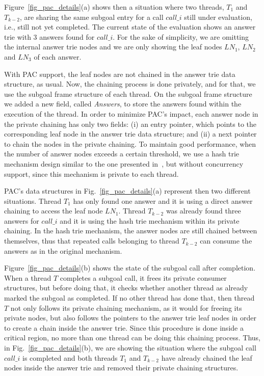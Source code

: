 \documentclass{llncs}
\begin{document}
Figure~\ref{fig_pac_details}(a) shows then a situation where two
threads, $T_1$ and $T_{k-2}$, are sharing the same subgoal entry for a
call $call\_i$ still under evaluation, i.e., still not yet
completed. The current state of the evaluation shows an answer trie
with 3 answers found for $call\_i$. For the sake of simplicity, we are
omitting the internal answer trie nodes and we are only showing the
leaf nodes $LN_1$, $LN_2$ and $LN_3$ of each answer.

With PAC support, the leaf nodes are not chained in the answer trie
data structure, as usual. Now, the chaining process is done privately,
and for that, we use the subgoal frame structure of each thread. On
the subgoal frame structure we added a new field, called
\emph{Answers}, to store the answers found within the execution of the
thread. In order to minimize PAC's impact, each answer node in the
private chaining has only two fields: (i) an entry pointer, which
points to the corresponding leaf node in the answer trie data
structure; and (ii) a next pointer to chain the nodes in the private
chaining. To maintain good performance, when the number of answer
nodes exceeds a certain threshold, we use a hash trie mechanism design
similar to the one presented in~\cite{Areias-ijpp15}, but without
concurrency support, since this mechanism is private to each thread.

PAC's data structures in Fig.~\ref{fig_pac_details}(a) represent then
two different situations. Thread $T_1$ has only found one answer and
it is using a direct answer chaining to access the leaf node
$LN_1$. Thread $T_{k-2}$ was already found three answers for $call\_i$
and it is using the hash trie mechanism within its private
chaining. In the hash trie mechanism, the answer nodes are still
chained between themselves, thus that repeated calls belonging to
thread $T_{k-2}$ can consume the answers as in the original mechanism.

Figure~\ref{fig_pac_details}(b) shows the state of the subgoal call
after completion. When a thread $T$ completes a subgoal call, it frees
its private consumer structures, but before doing that, it checks
whether another thread as already marked the subgoal as completed. If
no other thread has done that, then thread $T$ not only follows its
private chaining mechanism, as it would for freeing its private nodes,
but also follows the pointers to the answer trie leaf nodes in order
to create a chain inside the answer trie. Since this procedure is done
inside a critical region, no more than one thread can be doing this
chaining process. Thus, in Fig.~\ref{fig_pac_details}(b), we are
showing the situation where the subgoal call $call\_i$ is completed
and both threads $T_1$ and $T_{k-2}$ have already chained the leaf
nodes inside the answer trie and removed their private chaining
structures.
\end{document}
